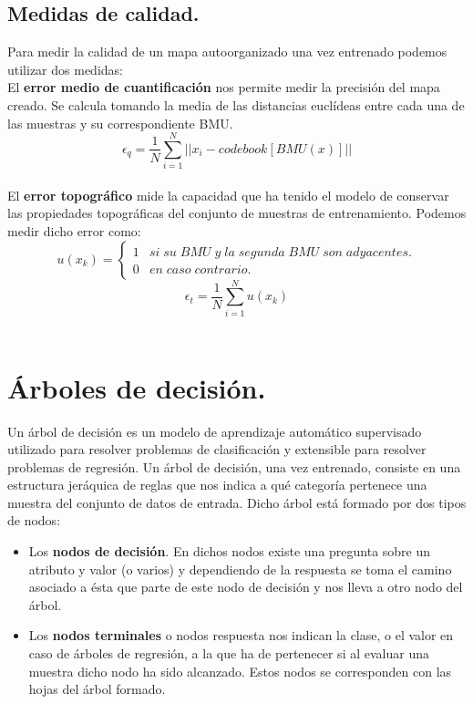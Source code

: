 \subsection{Medidas de calidad.}
Para medir la calidad de un mapa autoorganizado una vez entrenado podemos utilizar dos medidas:\\

El \textbf{error medio de cuantificación} nos permite medir la precisión del mapa creado. Se calcula tomando la media de las distancias euclídeas entre cada una de las muestras y su correspondiente BMU.\\

$$
\epsilon_q = \frac{1}{N}\sum_{i=1}^{N}  || x_i - codebook[BMU(x)] ||
$$\\

El \textbf{error topográfico} mide la capacidad que ha tenido el modelo de conservar las propiedades topográficas del conjunto de muestras de entrenamiento. Podemos medir dicho error como:\\
$$
u(x_k) = \left\{
\begin{array}{ll}
1 & si \; su \; BMU \; y \; la \; segunda \; BMU \; son \; adyacentes.\\
0 & en \; caso \; contrario.
\end{array}
\right.
$$
$$
\epsilon_t =  \frac{1}{N}\sum_{i=1}^{N} u(x_k)
$$\\

\newpage
\section{Árboles de decisión.}
Un árbol de decisión \cite{arbol} es un modelo de aprendizaje automático supervisado utilizado para resolver problemas de clasificación y extensible para resolver problemas de regresión. Un árbol de decisión, una vez entrenado, consiste en una estructura jeráquica de reglas que nos indica a qué categoría pertenece una muestra del conjunto de datos de entrada. Dicho árbol está formado por dos tipos de nodos:
\begin{itemize}
	\item Los \textbf{nodos de decisión}. En dichos nodos existe una pregunta sobre un atributo y valor (o varios) y dependiendo de la respuesta se toma el camino asociado a ésta que parte de este nodo de decisión y nos lleva a otro nodo del árbol.
	\item Los \textbf{nodos terminales} o nodos respuesta nos indican la clase, o el valor en caso de árboles de regresión, a la que ha de pertenecer si al evaluar una muestra dicho nodo ha sido alcanzado. Estos nodos se corresponden con las hojas del árbol formado.
\end{itemize}


